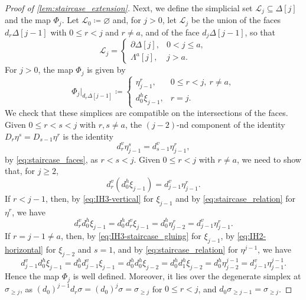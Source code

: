 \documentclass[10pt,reqno]{amsart}
\begin{document}
\begin{proof}[Proof of \cref{lem:staircase_extension}]
Next, we define the simplicial set $\mathcal L_j\subseteq\Delta[j]$
and the map $\Phi_j$. Let $\mathcal L_0\coloneqq\varnothing$ and,
for $j>0$, let $\mathcal L_j$ be the union of the faces
$d_r\Delta[j-1]$ with $0\le r<j$ and $r\ne a$, and of the face
$d_j\Delta[j-1]$, so that
\begin{equation}\label{eq:Lj-cases}
  \mathcal L_j=
  \begin{cases}
    \partial\Delta[j], & 0<j\le a,\\[1mm]
    \Lambda^a[j], & j>a.
  \end{cases}
\end{equation}
For $j>0$, the map $\Phi_j$ is given by
\begin{equation}\label{eq:Phij-faces}
  \Phi_j|_{d_r\Delta[j-1]}\coloneqq
  \begin{cases}
    \eta^r_{j-1}, & 0\le r<j,\ r\ne a,\\[1mm]
    d_0^h\xi_{j-1}, & r=j.
  \end{cases}
\end{equation}
We check that these simplices are compatible on the intersections of
the faces. Given $0\le r<s<j$ with $r,s\ne a$, the
$(j-2)$-nd component of the identity $D_r\eta^s=D_{s-1}\eta^r$ is
the identity
\[
  d_r^v\eta^s_{j-1}=d_{s-1}^v\eta^r_{j-1},
\]
by \eqref{eq:staircase_faces}, as $r<s<j$. Given $0\le r<j$ with
$r\ne a$, we need to show that, for $j\geq2$,
\begin{equation}\label{eq:vertical-final-needed}
  d_r^v(d_0^h\xi_{j-1})=d_{j-1}^v\eta^r_{j-1}.
\end{equation}
If $r<j-1$, then, by \eqref{eq:IH3-vertical} for $\xi_{j-1}$ and by
\eqref{eq:staircase_relation} for $\eta^r$, we have
\[
  d_r^vd_0^h\xi_{j-1}
  =d_0^hd_r^v\xi_{j-1}
  =d_0^h\eta^r_{j-2}
  =d_{j-1}^v\eta^r_{j-1}.
\]
If $r=j-1\ne a$, then, by \eqref{eq:IH3-staircase_gluing} for
$\xi_{j-1}$, by \eqref{eq:IH2-horizontal} for $\xi_{j-2}$ and
$s=1$, and by \eqref{eq:staircase_relation} for $\eta^{j-1}$, we
have
\[
  d_{j-1}^vd_0^h\xi_{j-1}
  =d_0^hd_{j-1}^v\xi_{j-1}
  =d_0^hd_0^h\xi_{j-2}
  =d_0^hd_1^h\xi_{j-2}
  =d_0^h\eta^{j-1}_{j-2}
  =d_{j-1}^v\eta^{j-1}_{j-1}.
\]
Hence the map $\Phi_j$ is well defined. Moreover, it lies over the
degenerate simplex at $\sigma_{\geq j}$, as
$(d_0)^{j-1}d_r\sigma=(d_0)^j\sigma=\sigma_{\geq j}$ for
$0\leq r<j$, and $d_0\sigma_{\geq j-1}=\sigma_{\geq j}$.


\end{proof}
\end{document}
